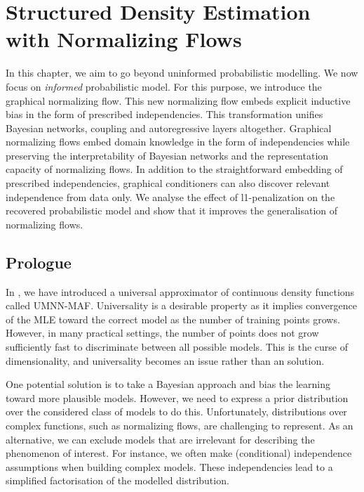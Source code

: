 

\chapter{Structured Density Estimation with Normalizing Flows}\label{ch:06}

\begin{chapter_outline}
  In this chapter, we aim to go beyond uninformed probabilistic modelling. We now focus on \textit{informed} probabilistic model.
  For this purpose, we introduce the graphical normalizing flow. This new normalizing flow embeds explicit inductive bias in the form of prescribed independencies. This transformation unifies Bayesian networks, coupling and autoregressive layers altogether. Graphical normalizing flows embed domain knowledge in the form of independencies while preserving the interpretability of Bayesian networks and the representation capacity of normalizing flows. In addition to the straightforward embedding of prescribed independencies, graphical conditioners can also discover relevant independence from data only. We analyse the effect of l1-penalization on the recovered probabilistic model and show that it improves the generalisation of normalizing flows.
\end{chapter_outline}

\section{Prologue}
In , we have introduced a universal approximator of continuous density functions called UMNN-MAF. Universality is a desirable property as it implies convergence of the MLE toward the correct model as the number of training points grows. However, in many practical settings, the number of points does not grow sufficiently fast to discriminate between all possible models. This is the curse of dimensionality, and universality becomes an issue rather than an solution.

One potential solution is to take a Bayesian approach and bias the learning toward more plausible models. However, we need to express a prior distribution over the considered class of models to do this. Unfortunately, distributions over complex functions, such as normalizing flows, are challenging to represent. As an alternative, we can exclude models that are irrelevant for describing the phenomenon of interest. For instance, we often make (conditional) independence assumptions when building complex models. These independencies lead to a simplified factorisation of the modelled distribution.

